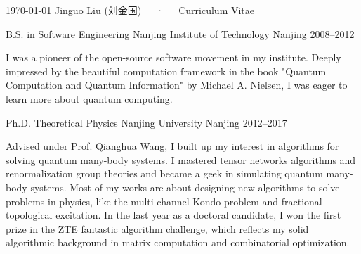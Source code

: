 \documentclass[11pt, a4paper]{awesome-cv}
\begin{document}
\makecvheader

\makecvfooter
  {\today}
  {Jinguo Liu (刘金国)~~~·~~~Curriculum Vitae}
  {\thepage}


\begin{cventries}
  \cventry
    {B.S. in Software Engineering}
    {Nanjing Institute of Technology}
    {Nanjing}
    {2008--2012}
    {\begin{cvitems}
     I was a pioneer of the open-source software movement in my institute. Deeply impressed by the beautiful computation framework in the book "Quantum Computation and Quantum Information" by Michael A. Nielsen, I was eager to learn more about quantum computing.
    \end{cvitems}}
  \cventry
    {Ph.D. Theoretical Physics}
    {Nanjing University}
    {Nanjing}
    {2012--2017}
    {\begin{cvitems}
    Advised under Prof. Qianghua Wang, I built up my interest in algorithms for solving quantum many-body systems.
    I mastered tensor networks algorithms and renormalization group theories and became a geek in simulating quantum many-body systems. Most of my works are about designing new algorithms to solve problems in physics, like the multi-channel Kondo problem and fractional topological excitation.
    In the last year as a doctoral candidate, I won the first prize in the ZTE fantastic algorithm challenge, which reflects my solid algorithmic background in matrix computation and combinatorial optimization.
    \end{cvitems}}
\end{cventries}
\end{document}

